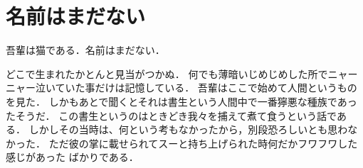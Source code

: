 \section{名前はまだない}
吾輩は猫である．名前はまだない．

どこで生まれたかとんと見当がつかぬ．
何でも薄暗いじめじめした所でニャーニャー泣いていた事だけは記憶している．
吾輩はここで始めて人間というものを見た．
しかもあとで聞くとそれは書生という人間中で一番獰悪な種族であったそうだ．
この書生というのはときどき我々を捕えて煮て食うという話である．
しかしその当時は、何という考もなかったから，別段恐ろしいとも思わなかった．
ただ彼の掌に載せられてスーと持ち上げられた時何だかフワフワした感じがあった
ばかりである．